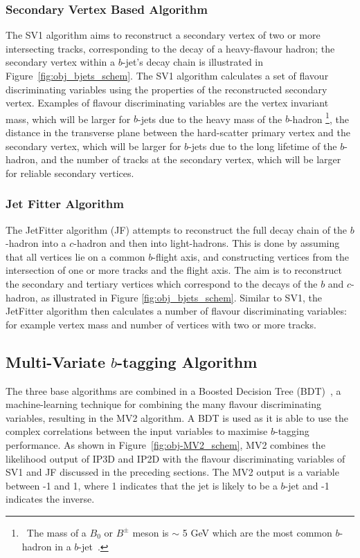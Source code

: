 \subsubsection{Secondary Vertex Based Algorithm}
\label{sec:obj-bjets_SV}

The SV1 algorithm aims to reconstruct a secondary vertex of two or more intersecting tracks, corresponding to the decay of a heavy-flavour hadron;
the secondary vertex within a $b$-jet's decay chain is illustrated in Figure~\ref{fig:obj_bjets_schem}.
The SV1 algorithm calculates a set of flavour discriminating variables using the properties of the reconstructed secondary vertex.
Examples of flavour discriminating variables are the vertex invariant mass,
which will be larger for $b$-jets due to the heavy mass of the $b$-hadron
\footnote{\ The mass of a $B_0$ or $B^\pm$ meson is $\sim$ 5 GeV which are the most common $b$-hadron in a $b$-jet~\cite{obj-bjets_PDG}.}, 
the distance in the transverse plane between the hard-scatter primary vertex and the secondary vertex, %
which will be larger for $b$-jets due to the long lifetime of the $b$-hadron,
and the number of tracks at the secondary vertex, which will be larger for reliable secondary vertices.

\subsubsection{Jet Fitter Algorithm}
\label{sec:obj-bjets_JF}

The JetFitter algorithm (JF) attempts to reconstruct the full decay chain of the $b$-hadron into a $c$-hadron and then into light-hadrons. 
This is done by assuming that all vertices lie on a common $b$-flight axis, and constructing vertices from the intersection of
one or more tracks and the flight axis.
The aim is to reconstruct the secondary and tertiary vertices which correspond to the decays of the $b$ and $c$-hadron,
as illustrated in Figure \ref{fig:obj_bjets_schem}.
Similar to SV1, the JetFitter algorithm then calculates a number of flavour discriminating variables:
for example vertex mass and number of vertices with two or more tracks.

\subsection{Multi-Variate $b$-tagging Algorithm}
\label{sec:obj-bjets_MV2}

The three base algorithms are combined in a Boosted Decision Tree (BDT)~\cite{obj-bjets_bdt},
a machine-learning technique for combining the many flavour discriminating variables, resulting in the MV2 algorithm.
A BDT is used as it is able to use the complex correlations between the input variables to maximise $b$-tagging performance.
As shown in Figure~\ref{fig:obj-MV2_schem}, MV2 combines the likelihood output of IP3D and IP2D
with the flavour discriminating variables of SV1 and JF discussed in the preceding sections.
The MV2 output is a variable between -1 and 1, where 1 indicates that the jet is likely to be a $b$-jet and -1 indicates the inverse.

